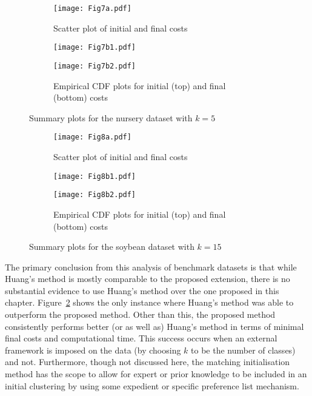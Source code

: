 \begin{figure}
    \begin{subfigure}{.5\textwidth}
        \texttt{[image: Fig7a.pdf]}
        \caption{Scatter plot of initial and final costs}
    \end{subfigure}
    \hfill%
    \begin{subfigure}{.5\textwidth}
        \texttt{[image: Fig7b1.pdf]}

        \texttt{[image: Fig7b2.pdf]}
        \caption{Empirical CDF plots for initial (top) and final (bottom) costs}
    \end{subfigure}
    \caption{Summary plots for the nursery dataset with \(k=5\)}%
    \label{fig:nursery_nclasses}
\end{figure}

\begin{figure}
    \begin{subfigure}{.5\textwidth}
        \texttt{[image: Fig8a.pdf]}
        \caption{Scatter plot of initial and final costs}
    \end{subfigure}
    \hfill%
    \begin{subfigure}{.5\textwidth}
        \texttt{[image: Fig8b1.pdf]}

        \texttt{[image: Fig8b2.pdf]}
        \caption{Empirical CDF plots for initial (top) and final (bottom) costs}
    \end{subfigure}
    \caption{Summary plots for the soybean dataset with \(k=15\)}%
    \label{fig:soybean_nclasses}
\end{figure}

The primary conclusion from this analysis of benchmark datasets is that while
Huang's method is mostly comparable to the proposed extension, there is no
substantial evidence to use Huang's method over the one proposed in this
chapter. Figure~\ref{fig:soybean_nclasses} shows the only instance where Huang's
method was able to outperform the proposed method. Other than this, the proposed
method consistently performs better (or as well as) Huang's method in terms of
minimal final costs and computational time. This success occurs when an external
framework is imposed on the data (by choosing \(k\) to be the number of classes)
and not. Furthermore, though not discussed here, the matching initialisation
method has the scope to allow for expert or prior knowledge to be included in an
initial clustering by using some expedient or specific preference list
mechanism.

